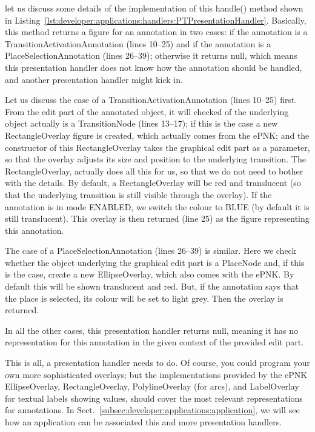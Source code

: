let us discuss some details of the implementation of this {\sf handle()} method shown in
Listing~\ref{lst:developer:applications:handlers:PTPresentationHandler}. Basically, this
method returns a figure for an annotation in two cases: if the annotation is a
{\sf TransitionActivationAnnotation} (lines 10--25) and if the annotation is a
{\sf PlaceSelectionAnnotation} (lines 26--39); otherwise it returns {\sf null}, which
means this presentation handler does not know how the annotation should be handled,
and another presentation handler might kick in.

Let us discuss the case of a {\sf TransitionActivationAnnotation} (lines 10--25) first.
From the edit part of the annotated object, it will checked of the underlying object
actually is a {\sf TransitionNode} (lines 13--17); if this is the case a new {\sf RectangleOverlay}
figure is created, which actually comes from the ePNK; and the constructor of this
{\sf RectangleOverlay} takes the graphical edit part as a parameter, so that
the overlay adjusts its size and position to the underlying transition. The 
 {\sf RectangleOverlay}, actually does all this for us, so that we do
 not need to bother with the details. By default, a {\sf RectangleOverlay} will
 be red and translucent (so that the underlying transition is still visible through the
 overlay). If the annotation is in mode {\sf ENABLED}, we
 switch the colour to BLUE (by default it is still translucent). This overlay
 is then returned (line 25) as the figure representing this annotation.
 
 The case of a {\sf PlaceSelectionAnnotation} (lines 26--39) is similar. Here we
 check whether the object underlying the graphical edit part is a {\sf PlaceNode}
 and, if this is the case, create a new {\sf EllipseOverlay}, which also comes with
 the ePNK. By default this will be shown translucent and red. But, if the annotation
 says that the place is {\sf selected}, its colour will be set to light grey. Then
 the overlay is returned.
 
 In all the other cases, this presentation handler returns {\sf null}, meaning it
 has no representation for this annotation in the given context of the provided edit part.
 
 This is all, a presentation handler needs to do. Of course, you could program your own
 more sophisticated overlays; but the implementations provided by the ePNK {\sf EllipseOverlay},
 {\sf RectangleOverlay},  {\sf PolylineOverlay} (for arcs), and {\sf LabelOverlay} for textual
 labels showing values, should cover the most relevant representations for annotations.
 In Sect.~\ref{subsec:developer:applications:application}, we will see how an application can
 be associated this and more presentation handlers. 

